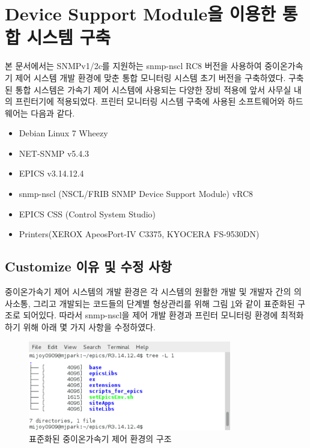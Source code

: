 \documentclass[11pt
  , a4paper
  , article
  , oneside
]{memoir}
\begin{document}
\clearpage

\section{Device Support Module을 이용한 통합 시스템 구축}
본 문서에서는 SNMPv1/2c를 지원하는 snmp-nscl RC8 버전을 사용하여 중이온가속기 제어 시스템 개발 환경에 맞춘 통합 모니터링 시스템 초기 버전을 구축하였다. 구축된 통합 시스템은 가속기 제어 시스템에 사용되는 다양한 장비 적용에 앞서 사무실 내의 프린터기에 적용되었다. 프린터 모니터링 시스템 구축에 사용된 소프트웨어와 하드웨어는 다음과 같다.

\begin{itemize}
\item Debian Linux 7 Wheezy
\item NET-SNMP v5.4.3
\item EPICS v3.14.12.4
\item snmp-nscl (NSCL/FRIB SNMP Device Support Module) vRC8
\item EPICS CSS (Control System Studio)
\item Printers(XEROX ApeosPort-IV C3375, KYOCERA FS-9530DN)
\end{itemize}

\subsection{Customize 이유 및 수정 사항}
중이온가속기 제어 시스템의 개발 환경은 각 시스템의 원활한 개발 및 개발자 간의 의사소통, 그리고 개발되는 코드들의 단계별 형상관리를 위해 그림 \ref{fig:epicstree}와 같이 표준화된 구조로 되어있다\citep{epicsev}. 따라서 snmp-nscl을 제어 개발 환경과 프린터 모니터링 환경에 최적화하기 위해 아래 몇 가지 사항을 수정하였다.

\begin{figure}[h!]
  \centering
  \includegraphics[width=0.79\textwidth]{./images/epicstree.eps}
  \caption{표준화된 중이온가속기 제어 환경의 구조}
  \label{fig:epicstree}   
\end{figure}
\end{document}
